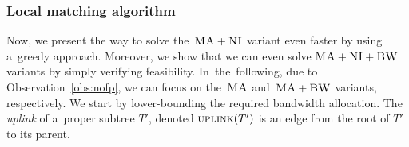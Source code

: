 \subsubsection{Local matching algorithm}

Now, we present the way to solve the~$\textsc{MA}+\textsc{NI}$ variant even faster by using a~greedy approach.
Moreover, we show that we can
even solve
$\textsc{MA}+\textsc{NI}+\textsc{BW}$ variants by simply
verifying feasibility.
In~the~following, due to Observation~\ref{obs:nofp}, we can focus on
the~$\textsc{MA}$ and~$\textsc{MA}+\textsc{BW}$ variants, respectively.
We start by lower-bounding the required bandwidth allocation.
The \emph{uplink} of a~proper subtree $T'$, denoted $\textsc{uplink}(T')$ is an edge from the root of $T'$ to its parent.

%
%





